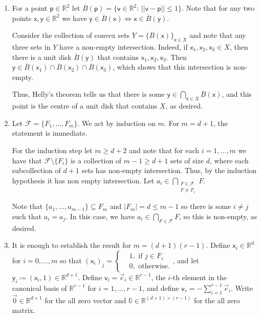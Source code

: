 \documentclass[kulak]{tplt}
\theoremstyle{definition}
\newcommand{\R}{\mathbb{R}}
\newcommand{\FF}{\mathcal F}
\newcommand{\vv}{\mathsf{v}}
\newcommand{\vx}{\mathsf{x}}
\newcommand{\vy}{\mathsf{y}}
\newcommand{\vp}{\mathsf{p}}
\begin{document}
\begin{enumerate}
\item 
For a point $\vp \in \R^2$ let $\overline{B}(\vp) = \{ \vv \in \R^2 : \, ||\vv - \vp|| \leq 1 \}$.
Note that for any two points $\vx, \vy \in \R^2$ we have $\vy \in \overline{B}(\vx) \Leftrightarrow \vx \in \overline{B}(\vy)$.

Consider the collection of convex sets $Y = \{\overline{B}(\vx)\}_{\vx \in X}$ and note that any three sets in $Y$ have a non-empty intersection.
Indeed, if $\vx_1, \vx_2, \vx_3 \in X$, then there is a unit disk $\overline{B}(\vy)$ that contains $\vx_1, \vx_2, \vx_3$.
Then $\vy \in \overline{B}(\vx_1)\cap \overline{B}(\vx_2) \cap \overline{B}(\vx_3)$, which shows that this intersection is non-empty.

Thus, Helly's theorem tells us that there is some $\vy \in \bigcap_{\vx \in X} \overline{B}(\vx) $, and this point is the centre of a unit disk that contains $X$, as desired.


\item 
Let $\FF = \{F_1, \ldots, F_m\}$.
We act by induction on $m$.
For $m = d+1$, the statement is immediate.

For the induction step let $m \geq d+2$ and note that for each $i = 1, \ldots, m$ we have that $\FF \setminus  \{ F_i\} $ is a collection of $m-1\geq d+1$ sets of size $d$, where each subcollection of $d+1$ sets has non-empty intersection.
Thus, by the induction hypothesis it has non empty intersection.
Let $a_i \in \bigcap_{\substack{ F \in \FF  \\ F \neq F_i }} F $.

Note that $\{a_1, \ldots, a_{m-1}\} \subseteq F_m$ and $|F_m| =d \leq m-1$ so there is some $i \neq j $ such that $a_i = a_j$.
In this case, we have $a_i \in \bigcap_{F \in \FF } F$, so this is non-empty, as desired.


\item 
It is enough to establish the result for $m = (d+1)(r-1)$.
Define $\vx_i \in \R^{d}$ for $i = 0, \ldots, m$ so that $(\vx_i)_j = \begin{cases}&1, \text{ if $j \in F_i$ } \\  &0, \text{ otherwise.}\end{cases}$, and let $\vy_i \coloneqq (\vx_i, 1) \in \R^{d+1}$.
Define $\vv_i = \vec{e}_i \in\R^{r-1}$, the $i$-th element in the canonical basis of $\R^{r-1}$ for $i = 1, \ldots, r-1$, and define $\vv_r = - \sum_{i=1}^{r-1} \vec{e}_i$.
Write $\vec{0} \in\R^{d+1}$ for the all zero vector and $\mathbb{0} \in \R^{(d+1)\times (r-1)}$ for the all zero matrix.


\end{enumerate}
\end{document}
